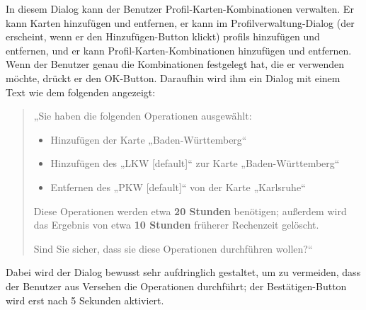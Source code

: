 \documentclass[a4paper, 11pt]{article}
\begin{document}
In diesem Dialog kann der Benutzer Profil-Karten-Kombinationen verwalten. Er kann Karten hinzufügen und entfernen, er kann im Profilverwaltung-Dialog (der erscheint, wenn er den Hinzufügen-Button klickt) \glspl{profil} hinzufügen und entfernen, und er kann Profil-Karten-Kombinationen hinzufügen und entfernen. Wenn der Benutzer genau die Kombinationen festgelegt hat, die er verwenden möchte, drückt er den OK-Button. Daraufhin wird ihm ein Dialog mit einem Text wie dem folgenden angezeigt:
\begin{quote}
  „Sie haben die folgenden Operationen ausgewählt:
  \begin{itemize}
  \item Hinzufügen der Karte „Baden-Württemberg“
  \item Hinzufügen des  „LKW [default]“ zur Karte „Baden-Württemberg“
  \item Entfernen des  „PKW [default]“ von der Karte „Karlsruhe“
  \end{itemize}
  Diese Operationen werden etwa \textbf{20 Stunden} benötigen; außerdem wird das Ergebnis von etwa \textbf{10 Stunden} früherer Rechenzeit gelöscht.
  
  Sind Sie sicher, dass sie diese Operationen durchführen wollen?“
\end{quote}
Dabei wird der Dialog bewusst sehr aufdringlich gestaltet, um zu vermeiden, dass der Benutzer aus Versehen die Operationen durchführt; der Bestätigen-Button wird erst nach 5 Sekunden aktiviert.
\end{document}
